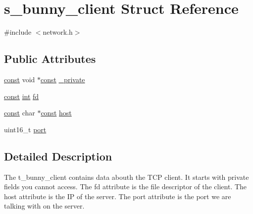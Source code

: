 \hypertarget{structs__bunny__client}{\section{s\-\_\-bunny\-\_\-client Struct Reference}
\label{structs__bunny__client}
}


{\ttfamily \#include $<$network.\-h$>$}

\subsection*{Public Attributes}
\begin{DoxyCompactItemize}
\item 
\hyperlink{term__entry_8h_a57bd63ce7f9a353488880e3de6692d5a}{const} void $\ast$\hyperlink{term__entry_8h_a57bd63ce7f9a353488880e3de6692d5a}{const} \hyperlink{structs__bunny__client_a88a21fe87518446a4d50a5a039f95993}{\-\_\-private}
\item 
\hyperlink{term__entry_8h_a57bd63ce7f9a353488880e3de6692d5a}{const} \hyperlink{term__entry_8h_ad65b480f8c8270356b45a9890f6499ae}{int} \hyperlink{structs__bunny__client_a60a49c90fc5bd5599074f569d51b3c4d}{fd}
\item 
\hyperlink{term__entry_8h_a57bd63ce7f9a353488880e3de6692d5a}{const} char $\ast$\hyperlink{term__entry_8h_a57bd63ce7f9a353488880e3de6692d5a}{const} \hyperlink{structs__bunny__client_abda1c49863888e4ef1c94379ba99e15c}{host}
\item 
uint16\-\_\-t \hyperlink{structs__bunny__client_af97995bf4950ecc2fba7cda85b9b4bd5}{port}
\end{DoxyCompactItemize}


\subsection{Detailed Description}
The t\-\_\-bunny\-\_\-client contains data abouth the T\-C\-P client. It starts with private fields you cannot access. The fd attribute is the file descriptor of the client. The host attribute is the I\-P of the server. The port attribute is the port we are talking with on the server. 

